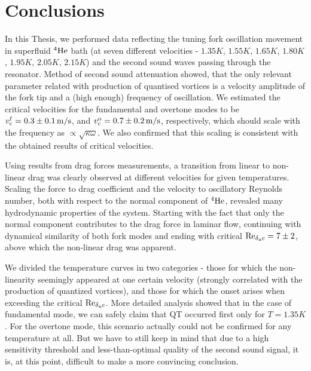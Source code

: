 \newpage

\chapter{Conclusions}

In this Thesis, we performed data reflecting the tuning fork oscillation movement in superfluid $ {}^4\mathrm{He} $ bath (at seven different velocities - $ 1.35\unit{K} $, $ 1.55\unit{K} $, $ 1.65\unit{K} $, $ 1.80\unit{K} $, $ 1.95\unit{K} $, $ 2.05\unit{K} $, $ 2.15\unit{K} $) and the second sound waves passing through the resonator. Method of second sound attenuation showed, that the only relevant parameter related with production of quantised vortices is a velocity amplitude of the fork tip and a (high enough) frequency of oscillation. We estimated the critical velocities for the fundamental and overtone modes to be $ v_{\mathrm{c}}^{\mathrm{f}} = 0.3 \pm 0.1 \,\mathrm{m/s}$, and $ v_{\mathrm{c}}^{\mathrm{o}} = 0.7 \pm 0.2 \,\mathrm{m/s} $, respectively, which should scale with the frequency as $ \propto \sqrt{\kappa\omega} $. We also confirmed that this scaling is consistent with the obtained results of critical velocities.

Using results from drag forces measurements, a transition from linear to non-linear drag was clearly observed at different velocities for given temperatures. Scaling the force to drag coefficient and the velocity to oscillatory Reynolds number, both with respect to the normal component of $ {}^4\mathrm{He} $, revealed many hydrodynamic properties of the system. Starting with the fact that only the normal component contributes to the drag force in laminar flow, continuing with dynamical similarity of both fork modes and ending with critical $\text{Re}_{\delta_{\mathrm{n}}c}=7\pm 2 $, above which the non-linear drag was apparent.

We divided the temperature curves in two categories - those for which the non-linearity seemingly appeared at one certain velocity (strongly correlated with the production of quantized vortices), and those for which the onset arises when exceeding the critical $\text{Re}_{\delta_{\mathrm{n}}c}$. More detailed analysis showed that in the case of fundamental mode, we can safely claim that QT occurred first only for $ T = 1.35\unit{K} $. For the overtone mode, this scenario actually could not be confirmed for any temperature at all. But we have to still keep in mind that due to a high sensitivity threshold and less-than-optimal quality of the second sound signal, it is, at this point, difficult to make a more convincing conclusion. 

